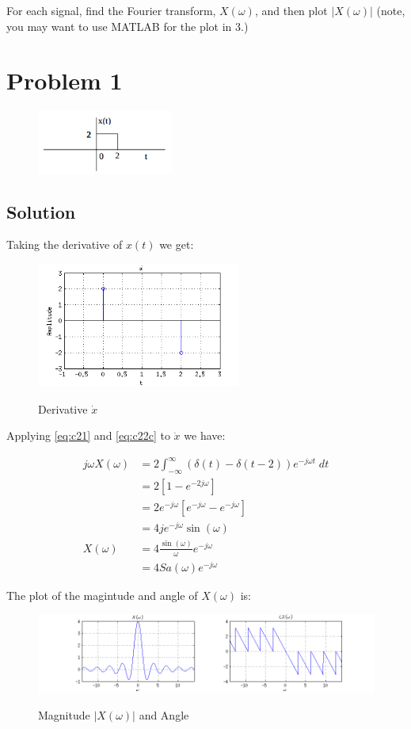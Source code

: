 For each signal, find the Fourier transform, $X(\omega)$, and then plot $|X(\omega)|$ 
(note, you may want to use MATLAB for the plot in 3.)

\section*{Problem 1}

\begin{figure}[H]
\caption*{}
\centering
\includegraphics[width=0.4\textwidth]{figs/c2p11.png}
\label{fig:}
\end{figure} 

\subsection*{Solution}
Taking the derivative of $x(t)$ we get:

\begin{figure}[H]
\caption{Derivative $\dot{x}$}
\centering
\includegraphics[width=0.6\textwidth]{figs/c2p1dotx.png}
\label{fig:}
\end{figure}

Applying \ref{eq:c21} and \ref{eq:c22c} to $\dot{x}$ we have:

\begin{equation*}
\begin{aligned}
j \omega X(\omega) &= 2 \int_{-\infty}^\infty (\delta(t) - \delta(t-2))e^{-j \omega t} \; dt\\
&= 2 [ 1 - e^{-2 j \omega}] \\
&= 2 e^{-j \omega}[ e^{- j \omega} - e^{- j \omega}] \\
&= 4 j e^{-j \omega} \sin(\omega) \\
X(\omega) &= 4 \frac{\sin(\omega) }{\omega} e^{-j \omega} \\
 &= 4 Sa(\omega) e^{- j \omega}
\end{aligned}
\end{equation*} 

The plot of the magintude and angle of $X(\omega)$ is:

\begin{figure}[H]
\caption{Magnitude $|X(\omega)|$ and Angle}
\centering
\includegraphics[width=1.0\textwidth]{figs/c2p1a.png}
\label{fig:c2p1a}
\end{figure} 

